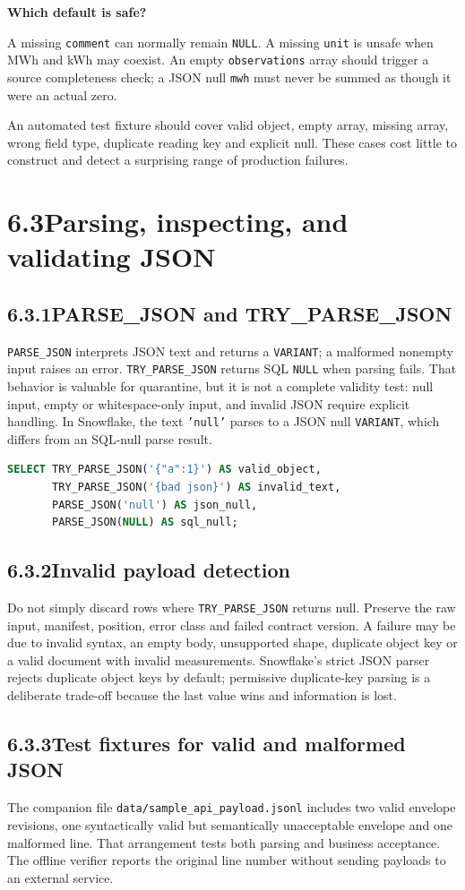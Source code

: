 \documentclass[11pt,twoside]{article}
\newcommand{\topic}[2]{\subsection*{#1\quad #2}}
\begin{document}
\begin{whitebox}\textbf{Which default is safe?}\par
A missing \texttt{comment} can normally remain \texttt{NULL}. A missing \texttt{unit} is unsafe when MWh and kWh may coexist. An empty \texttt{observations} array should trigger a source completeness check; a JSON null \texttt{mwh} must never be summed as though it were an actual zero.\end{whitebox}
An automated test fixture should cover valid object, empty array, missing array, wrong field type, duplicate reading key and explicit null. These cases cost little to construct and detect a surprising range of production failures.
\newpage
\section*{6.3\quad Parsing, inspecting, and validating JSON}
\topic{6.3.1}{PARSE\_JSON and TRY\_PARSE\_JSON}
\texttt{PARSE\_JSON} interprets JSON text and returns a \texttt{VARIANT}; a malformed nonempty input raises an error. \texttt{TRY\_PARSE\_JSON} returns SQL \texttt{NULL} when parsing fails. That behavior is valuable for quarantine, but it is not a complete validity test: null input, empty or whitespace-only input, and invalid JSON require explicit handling. In Snowflake, the text \texttt{'null'} parses to a JSON null \texttt{VARIANT}, which differs from an SQL-null parse result.

\begin{lstlisting}[language=SQL,caption={Observe four distinct parser outcomes.}]
SELECT TRY_PARSE_JSON('{"a":1}') AS valid_object,
       TRY_PARSE_JSON('{bad json}') AS invalid_text,
       PARSE_JSON('null') AS json_null,
       PARSE_JSON(NULL) AS sql_null;
\end{lstlisting}
\topic{6.3.2}{Invalid payload detection}
Do not simply discard rows where \texttt{TRY\_PARSE\_JSON} returns null. Preserve the raw input, manifest, position, error class and failed contract version. A failure may be due to invalid syntax, an empty body, unsupported shape, duplicate object key or a valid document with invalid measurements. Snowflake's strict JSON parser rejects duplicate object keys by default; permissive duplicate-key parsing is a deliberate trade-off because the last value wins and information is lost.

\topic{6.3.3}{Test fixtures for valid and malformed JSON}
The companion file \texttt{data/sample\_api\_payload.jsonl} includes two valid envelope revisions, one syntactically valid but semantically unacceptable envelope and one malformed line. That arrangement tests both parsing and business acceptance. The offline verifier reports the original line number without sending payloads to an external service.
\end{document}

